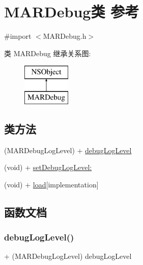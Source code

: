 \hypertarget{interface_m_a_r_debug}{}\section{M\+A\+R\+Debug类 参考}
\label{interface_m_a_r_debug}


{\ttfamily \#import $<$M\+A\+R\+Debug.\+h$>$}

类 M\+A\+R\+Debug 继承关系图\+:\begin{figure}[H]
\begin{center}
\leavevmode
\includegraphics[height=2.000000cm]{interface_m_a_r_debug}
\end{center}
\end{figure}
\subsection*{类方法}
\begin{DoxyCompactItemize}
\item 
(M\+A\+R\+Debug\+Log\+Level) + \hyperlink{interface_m_a_r_debug_a248b86e652defc13eeed8f91aaed2236}{debug\+Log\+Level}
\item 
(void) + \hyperlink{interface_m_a_r_debug_ae31f16a973ddd511bd5edce76a39ee6f}{set\+Debug\+Log\+Level\+:}
\item 
(void) + \hyperlink{interface_m_a_r_debug_a913bf856df48cb6b827c7c7b6ce73499}{load}{\ttfamily  \mbox{[}implementation\mbox{]}}
\end{DoxyCompactItemize}


\subsection{函数文档}
\mbox{\label{interface_m_a_r_debug_a248b86e652defc13eeed8f91aaed2236}} 
\subsubsection{\texorpdfstring{debug\+Log\+Level()}{debugLogLevel()}}
{\footnotesize\ttfamily + (M\+A\+R\+Debug\+Log\+Level) debug\+Log\+Level \begin{DoxyParamCaption}{ }\end{DoxyParamCaption}}

